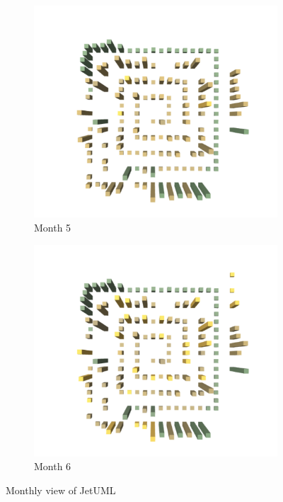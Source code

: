 \begin{figure}[t!]
    \medskip
    \begin{subfigure}{0.48\textwidth}
        \includegraphics[width=\linewidth]{JetUML_V1S5.png}
        \caption{Month 5} \label{fig:JetUML_V1S5}
    \end{subfigure}\hspace*{\fill}
    \begin{subfigure}{0.48\textwidth}
        \includegraphics[width=\linewidth]{JetUML_V1S6.png}
        \caption{Month 6} \label{fig:JetUML_V1S6}
    \end{subfigure}
    
    \caption{Monthly view of JetUML} 
    \label{fig:JetUML_V1}
\end{figure}



